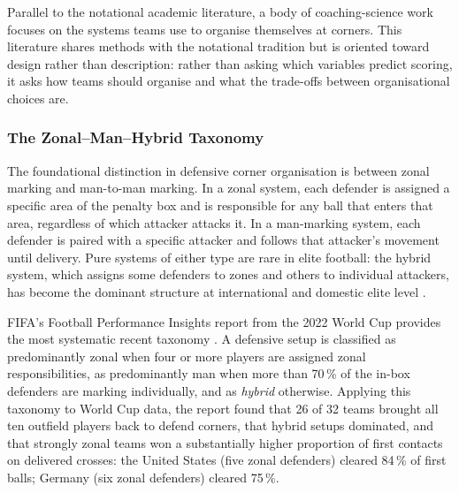Parallel to the notational academic literature, a body of coaching-science
work focuses on the systems teams use to organise themselves at corners.
This literature shares methods with the notational tradition but is oriented
toward design rather than description: rather than asking which variables predict
scoring, it asks how teams should organise and what the trade-offs between
organisational choices are.

\subsubsection{The Zonal--Man--Hybrid Taxonomy}

The foundational distinction in defensive corner organisation is between
zonal marking and man-to-man marking. In a zonal system, each
defender is assigned a specific area of the penalty box and is responsible for
any ball that enters that area, regardless of which attacker attacks it. In a
man-marking system, each defender is paired with a specific attacker and follows
that attacker's movement until delivery. Pure systems of either type are rare in
elite football: the hybrid system, which assigns some defenders to zones
and others to individual attackers, has become the dominant structure at
international and domestic elite level \citep{FIFA2023, MBP2025}.

FIFA's Football Performance Insights report from the 2022 World Cup provides
the most systematic recent taxonomy \citep{FIFA2023}. A defensive setup is
classified as predominantly zonal when four or more players are assigned
zonal responsibilities, as predominantly man when more than 70\,\% of
the in-box defenders are marking individually, and as \emph{hybrid} otherwise.
Applying this taxonomy to World Cup data, the report found that 26 of 32 teams
brought all ten outfield players back to defend corners, that hybrid setups
dominated, and that strongly zonal teams won a substantially higher proportion
of first contacts on delivered crosses: the United States (five zonal defenders)
cleared 84\,\% of first balls; Germany (six zonal defenders) cleared 75\,\%.

